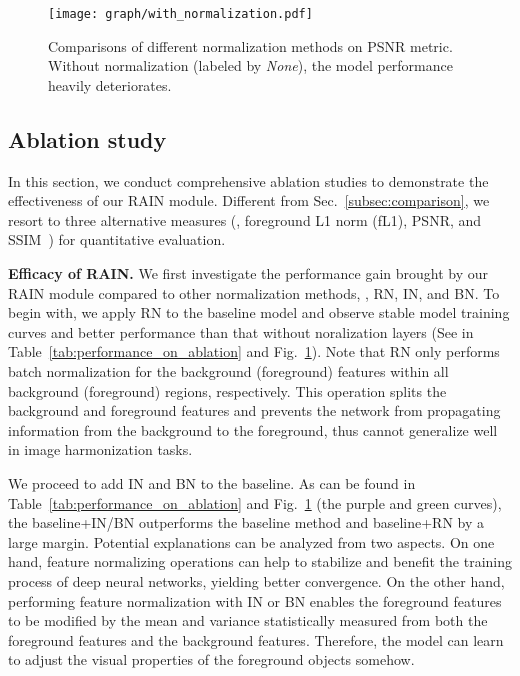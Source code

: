\documentclass[final]{cvpr}
\begin{document}
\begin{figure}
\begin{center}
\texttt{[image: graph/with\_normalization.pdf]}
\end{center}
   \caption{Comparisons of different normalization methods on PSNR metric. Without normalization (labeled by \emph{None}), the model performance heavily deteriorates. }
\label{fig:with_normalization}
\end{figure}
\subsection{Ablation study}
\label{subsec:ablation}
In this section, we conduct comprehensive ablation studies to demonstrate the effectiveness of our RAIN module. Different from Sec.~\ref{subsec:comparison}, we resort to three alternative measures (\ie, foreground L1 norm (fL1), PSNR, and SSIM~\cite{wang2004imagessim}) for quantitative evaluation. 



\noindent
\textbf{Efficacy of RAIN.} We first investigate the performance gain brought by our RAIN module compared to other normalization methods, \ie, RN, IN, and BN. To begin with, we apply RN to the baseline model and observe stable model training curves and better performance than that without noralization layers (See in Table~\ref{tab:performance_on_ablation} and Fig.~\ref{fig:with_normalization}). Note that RN only performs batch normalization for the background (foreground) features within all background (foreground) regions, respectively. This operation splits the background and foreground features and prevents the network from propagating information from the background to the foreground, thus cannot generalize well in image harmonization tasks.


We proceed to add IN and BN to the baseline. As can be found in Table~\ref{tab:performance_on_ablation} and Fig.~\ref{fig:with_normalization} (the purple and green curves), the baseline+IN/BN outperforms the baseline method and baseline+RN by a large margin. Potential explanations can be analyzed from two aspects. On one hand, feature normalizing operations can help to stabilize and benefit the training process of deep neural networks, yielding better convergence. On the other hand, performing feature normalization with IN or BN enables the foreground features to be modified by the mean and variance statistically measured from both the foreground features and the background features. Therefore, the model can learn to adjust the visual properties of the foreground objects somehow. 
\end{document}
